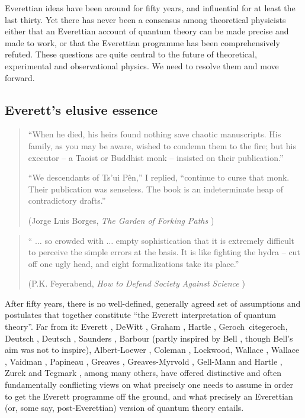 \documentclass[aps,
pra,epsfig,12pt,nofootinbib]{revtex4}
\begin{document}
Everettian ideas have been around for fifty years, and influential for
at least the last thirty.  Yet there has never been a consensus among
theoretical physicists either that an Everettian account of quantum
theory can be made precise and made to work, or that the Everettian
programme has been comprehensively refuted.  These questions are quite
central to the future of theoretical, experimental and observational
physics.  We need to resolve them and move forward.

\subsection{Everett's elusive essence}

\begin{quotation}
``When he died, his heirs found nothing save chaotic manuscripts. His
family, as you may be aware, wished to condemn them to the fire; but 
his executor -- a Taoist or Buddhist monk --  insisted on their
publication.''

``We descendants of Ts'ui P\^{e}n,'' I  replied, ``continue to curse that
monk. Their publication was senseless. The book is an indeterminate
heap of contradictory drafts.''

(Jorge Luis Borges, {\it The Garden of Forking Paths} \cite{borges}) 
\end{quotation}

\begin{quotation}
`` $\ldots$ so crowded with $\ldots$ empty
sophistication that it is extremely difficult to
perceive the simple errors at the basis. It is like fighting the hydra --
cut off one ugly head, and eight formalizations take its place.'' 

(P.K. Feyerabend, {\it  How to Defend Society Against 
Science} \cite{feyerabend})
\end{quotation}

After fifty years, there is no well-defined, generally agreed set of
assumptions and postulates that together constitute ``the Everett
interpretation of quantum theory''.  Far from it: Everett \cite{everettone,everetttwo}, 
DeWitt \cite{dewitt}, Graham \cite{graham}, Hartle \cite{hartlefreq}, Geroch\ cite{geroch}, 
Deutsch \cite{deutschone}, Deutsch \cite{deutschtwo}, 
Saunders \cite{saundersvol}, Barbour \cite {barbour} (partly inspired
by Bell \cite{bellmw}, though Bell's aim was not to inspire), 
Albert-Loewer \cite{almanyminds}, Coleman \cite{coleman}, 
Lockwood\cite{lockwood}, Wallace \cite{wallacevolone}, 
Wallace \cite{wallacevoltwo}, Vaidman \cite{vaidman}, 
Papineau \cite{papineauvol}, Greaves \cite{greaves}, 
Greaves-Myrvold \cite{greavesmyrvoldvol},
Gell-Mann and Hartle \cite{hartlevol}, Zurek \cite{zurekvol} and
Tegmark \cite{tegmarkvol}, among many others, have offered
distinctive and often fundamentally conflicting views on what 
precisely one needs to assume in order to get the Everett programme off
the ground, and what precisely an Everettian (or, some say,
post-Everettian) version of quantum theory entails.  
\end{document}
